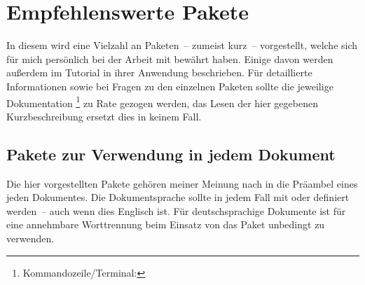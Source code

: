 \newcommand*\RecPack{%
  \hyperref[sec:packages:recommended]{Paketbeschreibung}:\xspace%
}
\section{Empfehlenswerte Pakete}
%
%
In diesem \autorefname wird eine Vielzahl an Paketen~-- zumeist kurz~-- 
vorgestellt, welche sich für mich persönlich bei der Arbeit mit  
bewährt haben. Einige davon werden außerdem im Tutorial  in 
ihrer Anwendung beschrieben. Für detaillierte Informationen sowie bei Fragen zu 
den einzelnen Paketen sollte die jeweilige Dokumentation%
\footnote{Kommandozeile/Terminal: }
zu Rate gezogen werden, das Lesen der hier gegebenen Kurzbeschreibung ersetzt 
dies in keinem Fall. 


\subsection{Pakete zur Verwendung in jedem Dokument}
Die hier vorgestellten Pakete gehören meiner Meinung nach in die Präambel eines 
jeden Dokumentes. Die Dokumentsprache sollte in jedem Fall mit  
oder  definiert werden~-- auch wenn dies Englisch ist. Für 
deutschsprachige Dokumente ist für eine annehmbare Worttrennung beim Einsatz 
von  das Paket  unbedingt zu verwenden.


